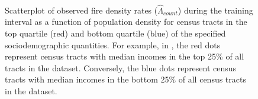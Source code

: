 \documentclass{svjour3}
\begin{document}
\begin{figure}[!htb]
\begin{center}
{          }
            \\
          
      \end{center}
      \caption{Scatterplot of observed fire density rates ($\hat\Lambda_{count}$) during the training interval as a function of population density for census tracts in the top quartile (red) and bottom quartile (blue) of the specified sociodemographic quantities. For example, in \protect{}, the red dots represent census tracts with median incomes in the top 25\% of all tracts in the dataset. Conversely, the blue dots represent census tracts with median incomes in the bottom 25\% of all census tracts in the dataset.}
     \label{fig:sociodemographic}
  \end{figure}
 
\end{document}
